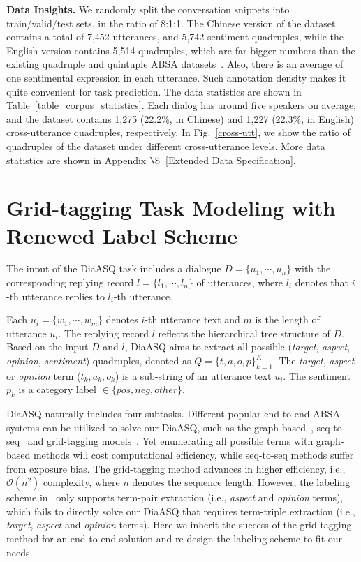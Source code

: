\documentclass[11pt]{article}
\begin{document}
\vspace{2pt}
\textbf{Data Insights.}
We randomly split the conversation snippets into train/valid/test sets, in the ratio of 8:1:1.
The Chinese version of the dataset contains a total of 7,452 utterances, and 5,742 sentiment quadruples, while the English version contains 5,514 quadruples, which are far bigger numbers than the existing quadruple and quintuple ABSA datasets~\cite{CaiXY20, ZhangD0YBL21}.
Also, there is an average of one sentimental expression in each utterance.
Such annotation density makes it quite convenient for task prediction.
The data statistics are shown in Table~\ref{table_corpus_statistics}.
Each dialog has around five speakers on average, and the dataset contains 1,275 (22.2\%, in Chinese) and 1,227 (22.3\%, in English) cross-utterance quadruples, respectively.
In Fig.~\ref{cross-utt}, we show the ratio of quadruples of the dataset under different cross-utterance levels.
More data statistics are shown in Appendix $\S$~\ref{Extended Data Specification}.

\section{Grid-tagging Task Modeling with Renewed Label Scheme}
\label{Grid-tagging Modeling with Renewed Label Scheme}
The input of the DiaASQ task includes a dialogue $D=\{u_1,\cdots,u_n\}$ with the corresponding replying record $l=\{l_1,\cdots,l_n\}$ of utterances, where $l_i$ denotes that $i$-th utterance replies to $l_i$-th utterance.

Each  $u_i=\{w_{1}, \cdots,w_{m}\}$ denotes $i$-th utterance text and $m$ is the length of utterance $u_i$.
The replying record $l$ reflects the hierarchical tree structure of $D$.
Based on the input $D$ and $l$, DiaASQ aims to extract all possible (\emph{target}, \emph{aspect}, \emph{opinion}, \emph{sentiment}) quadruples, denoted as $Q=\{t,a,o,p\}_{k=1}^K$.
The \emph{target}, \emph{aspect} or \emph{opinion} term ($t_k, a_k, o_k$) is a sub-string of an utterance text $u_i$.
The sentiment $p_k$ is a category label $\in\{pos,neg,other\}$.

DiaASQ naturally includes four subtasks.
Different popular end-to-end ABSA systems can be utilized to solve our DiaASQ, such as the graph-based~\cite{zhu-tal-01-clser,ChenZFLW22}, seq-to-seq~\cite{Zhang0DBL20,mu-etal-21-pte} and grid-tagging models~\cite{wu-etal-2020-grid}.
Yet enumerating all possible terms with graph-based methods will cost computational efficiency, while seq-to-seq methods suffer from exposure bias.
The grid-tagging method advances in higher efficiency, i.e., $\mathcal{O}(n^2)$ complexity, where $n$ denotes the sequence length.
However, the labeling scheme in~\cite{CaiXY20, ZhangD0YBL21} only supports term-pair extraction (i.e., \emph{aspect} and \emph{opinion} terms), which fails to directly solve our DiaASQ that requires term-triple extraction (i.e., \emph{target}, \emph{aspect} and \emph{opinion} terms).
Here we inherit the success of the grid-tagging method for an end-to-end solution and re-design the labeling scheme to fit our needs.
\end{document}
